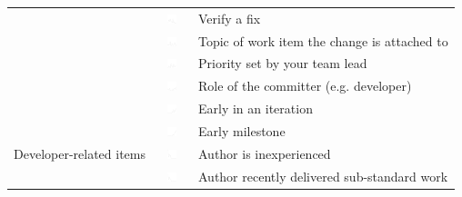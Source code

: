 \begin{table}[t!]
\begin{tabular}{rll}
&\vspace{-2pt}\includegraphics[height=10px, width=30px]{figures/sparkles/you-need-to-verify-a-fix.pdf} & Verify a fix\\
&\vspace{-2pt}\includegraphics[height=10px, width=30px]{figures/sparkles/topic-of-work-item-the-change-is-attached-to.pdf} & Topic of work item the change is attached to\\ 
&\vspace{-2pt}\includegraphics[height=10px, width=30px]{figures/sparkles/priority-of-related-work-item-was-set-from-your-team-lead.pdf} & Priority set by your team lead\\
&\vspace{-2pt}\includegraphics[height=10px, width=30px]{figures/sparkles/role-of-committer--e-g--developer--team-lead--intern.pdf} & Role of the committer (e.g. developer)\\
&\vspace{-2pt}\includegraphics[height=10px, width=30px]{figures/sparkles/early-in-an-iteration.pdf} & Early in an iteration\\
&\vspace{-2pt}\includegraphics[height=10px, width=30px]{figures/sparkles/early-milestone.pdf} & Early milestone\\
\midrule
Developer-related items&\vspace{-2pt}\includegraphics[height=10px, width=30px]{figures/sparkles/change-author-is-inexperienced.pdf} & Author is inexperienced\\
&\vspace{-2pt}\includegraphics[height=10px, width=30px]{figures/sparkles/recent-work-of-low-quality.pdf} & Author recently delivered sub-standard work\\

\end{tabular}
\end{table}
